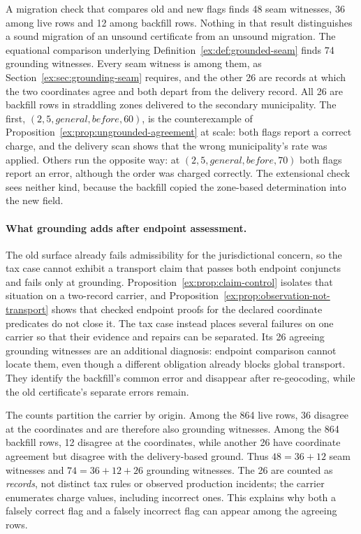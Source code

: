 \documentclass[smallextended,envcountsect,envcountsame,natbib]{svjour3}
\begin{document}
A migration check that compares old and new flags finds 48 seam witnesses, 36 among live rows and 12 among backfill rows. Nothing in that result distinguishes a sound migration of an unsound certificate from an unsound migration. The equational comparison underlying Definition~\ref{ex:def:grounded-seam} finds 74 grounding witnesses. Every seam witness is among them, as Section~\ref{ex:sec:grounding-seam} requires, and the other 26 are records at which the two coordinates agree and both depart from the delivery record. All 26 are backfill rows in straddling zones delivered to the secondary municipality. The first, $(2,5,\mathit{general},\mathit{before},60)$, is the counterexample of Proposition~\ref{ex:prop:ungrounded-agreement} at scale: both flags report a correct charge, and the delivery scan shows that the wrong municipality's rate was applied. Others run the opposite way: at $(2,5,\mathit{general},\mathit{before},70)$ both flags report an error, although the order was charged correctly. The extensional check sees neither kind, because the backfill copied the zone-based determination into the new field.

\paragraph{What grounding adds after endpoint assessment.}
The old surface already fails admissibility for the jurisdictional concern, so the tax case cannot exhibit a transport claim that passes both endpoint conjuncts and fails only at grounding. Proposition~\ref{ex:prop:claim-control} isolates that situation on a two-record carrier, and Proposition~\ref{ex:prop:observation-not-transport} shows that checked endpoint proofs for the declared coordinate predicates do not close it. The tax case instead places several failures on one carrier so that their evidence and repairs can be separated. Its 26 agreeing grounding witnesses are an additional diagnosis: endpoint comparison cannot locate them, even though a different obligation already blocks global transport. They identify the backfill's common error and disappear after re-geocoding, while the old certificate's separate errors remain.

The counts partition the carrier by origin. Among the 864 live rows, 36 disagree at the coordinates and are therefore also grounding witnesses. Among the 864 backfill rows, 12 disagree at the coordinates, while another 26 have coordinate agreement but disagree with the delivery-based ground. Thus $48=36+12$ seam witnesses and $74=36+12+26$ grounding witnesses. The 26 are counted as \emph{records}, not distinct tax rules or observed production incidents; the carrier enumerates charge values, including incorrect ones. This explains why both a falsely correct flag and a falsely incorrect flag can appear among the agreeing rows.
\end{document}
